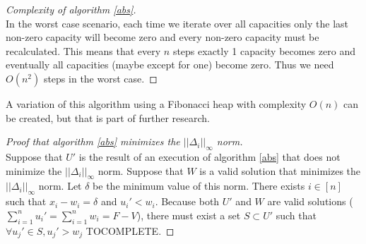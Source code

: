 \documentclass[11pt]{article}
\theoremstyle{definition}
\theoremstyle{corollary}
\theoremstyle{lemma}
\begin{document}
    \begin{proof}[Complexity of algorithm \ref{abs}] \ \\
       In the worst case scenario, each time we iterate over all capacities only the last non-zero capacity will become zero
       and every non-zero capacity must be recalculated. This means that every $n$ steps exactly 1 capacity becomes zero
       and eventually all capacities (maybe except for one) become zero. Thus we need $O(n^2)$ steps in the worst case.
    \end{proof}
    A variation of this algorithm using a Fibonacci heap with complexity $O(n)$ can be created, but that is part of 
    further research.
    \begin{proof}[Proof that algorithm \ref{abs} minimizes the $||\Delta_i||_\infty$ norm] \ \\
       Suppose that $U'$ is the result of an execution of algorithm \ref{abs} that does not minimize the $||\Delta_i||_\infty$
       norm. Suppose that $W$ is a valid solution that minimizes the $||\Delta_i||_\infty$ norm. Let $\delta$ be the minimum
       value of this norm. There exists $i \in [n]$ such that $x_i - w_i = \delta$ and $u_i' < w_i$. Because both $U'$
       and $W$ are valid solutions ($\sum\limits_{i=1}^{n}u_i' = \sum\limits_{i=1}^{n}w_i = F - V$), there must exist a set
       $S \subset U'$ such that $\forall u_j' \in S, u_j' > w_j$ TOCOMPLETE.
    \end{proof}
\end{document}

